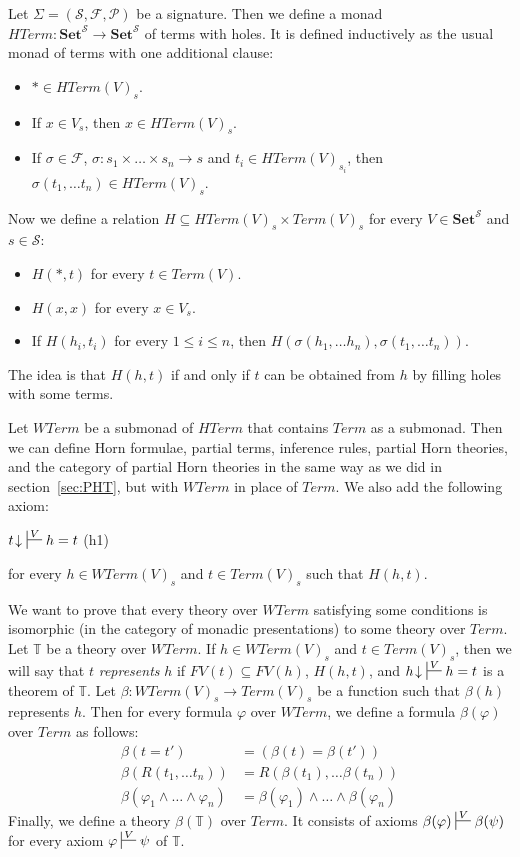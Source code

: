 \documentclass[reqno]{amsart}
\newcommand{\axlabel}[1]{(#1) \phantomsection \label{ax:#1}}
\theoremstyle{definition}
\theoremstyle{remark}
\newcommand{\cat}[1]{\mathbf{#1}}
\newcommand{\Set}{\cat{Set}}
\numberwithin{figure}{section}
\begin{document}
Let $\Sigma = (\mathcal{S},\mathcal{F},\mathcal{P})$ be a signature.
Then we define a monad $HTerm : \Set^\mathcal{S} \to \Set^\mathcal{S}$ of terms with holes.
It is defined inductively as the usual monad of terms with one additional clause:
\begin{itemize}
\item $* \in HTerm(V)_s$.
\item If $x \in V_s$, then $x \in HTerm(V)_s$.
\item If $\sigma \in \mathcal{F}$, $\sigma : s_1 \times \ldots \times s_n \to s$ and $t_i \in HTerm(V)_{s_i}$, then $\sigma(t_1, \ldots t_n) \in HTerm(V)_s$.
\end{itemize}

Now we define a relation $H \subseteq HTerm(V)_s \times Term(V)_s$ for every $V \in \Set^\mathcal{S}$ and $s \in \mathcal{S}$:
\begin{itemize}
\item $H(*,t)$ for every $t \in Term(V)$.
\item $H(x,x)$ for every $x \in V_s$.
\item If $H(h_i,t_i)$ for every $1 \leq i \leq n$, then $H(\sigma(h_1, \ldots h_n), \sigma(t_1, \ldots t_n))$.
\end{itemize}
The idea is that $H(h,t)$ if and only if $t$ can be obtained from $h$ by filling holes with some terms.

Let $WTerm$ be a submonad of $HTerm$ that contains $Term$ as a submonad.
Then we can define Horn formulae, partial terms, inference rules, partial Horn theories, and the category of partial Horn theories
    in the same way as we did in section~\ref{sec:PHT}, but with $WTerm$ in place of $Term$.
We also add the following axiom:
\begin{center}
$t\!\downarrow\ \sststile{}{V} h = t$ \axlabel{h1}
\end{center}
for every $h \in WTerm(V)_s$ and $t \in Term(V)_s$ such that $H(h,t)$.

We want to prove that every theory over $WTerm$ satisfying some conditions is isomorphic (in the category of monadic presentations) to some theory over $Term$.
Let $\mathbb{T}$ be a theory over $WTerm$.
If $h \in WTerm(V)_s$ and $t \in Term(V)_s$, then we will say that $t$ \emph{represents} $h$ if $FV(t) \subseteq FV(h)$,
    $H(h,t)$, and $h\!\downarrow\ \sststile{}{V} h = t$ is a theorem of $\mathbb{T}$.
Let $\beta : WTerm(V)_s \to Term(V)_s$ be a function such that $\beta(h)$ represents $h$.
Then for every formula $\varphi$ over $WTerm$, we define a formula $\beta(\varphi)$ over $Term$ as follows:
\begin{align*}
\beta(t = t') & = (\beta(t) = \beta(t')) \\
\beta(R(t_1, \ldots t_n)) & = R(\beta(t_1), \ldots \beta(t_n)) \\
\beta(\varphi_1 \land \ldots \land \varphi_n) & = \beta(\varphi_1) \land \ldots \land \beta(\varphi_n)
\end{align*}
Finally, we define a theory $\beta(\mathbb{T})$ over $Term$.
It consists of axioms $\beta(\varphi) \sststile{}{V} \beta(\psi)$ for every axiom $\varphi \sststile{}{V} \psi$ of $\mathbb{T}$.
\end{document}
